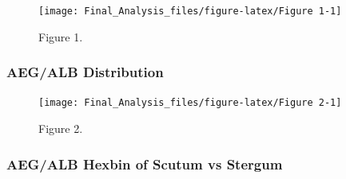 \begin{figure}

{\centering \texttt{[image: Final\_Analysis\_files/figure-latex/Figure 1-1]} 

}

\caption{Figure 1.}\label{Figure Figure 1}
\end{figure}

\subsubsection{AEG/ALB Distribution}\label{aegalb-distribution}

\begin{Shaded}
\begin{Highlighting}[]
\NormalTok{(}\NormalTok{(}\NormalTok{,}\NormalTok{))}
\NormalTok{, }\NormalTok{, } \NormalTok{(}\NormalTok{, }\NormalTok{))}
\NormalTok{, }\NormalTok{, } \NormalTok{(}\NormalTok{, }\NormalTok{))}
\end{Highlighting}
\end{Shaded}

\begin{figure}

{\centering \texttt{[image: Final\_Analysis\_files/figure-latex/Figure 2-1]} 

}

\caption{Figure 2.}\label{Figure Figure 2}
\end{figure}

\subsubsection{AEG/ALB Hexbin of Scutum vs
Stergum}\label{aegalb-hexbin-of-scutum-vs-stergum}

\begin{Shaded}
\begin{Highlighting}[]
\StringTok{ }\NormalTok{)}
\NormalTok{, }\NormalTok{(}\NormalTok{(}\NormalTok{,}\NormalTok{)))}
\end{Highlighting}
\end{Shaded}

